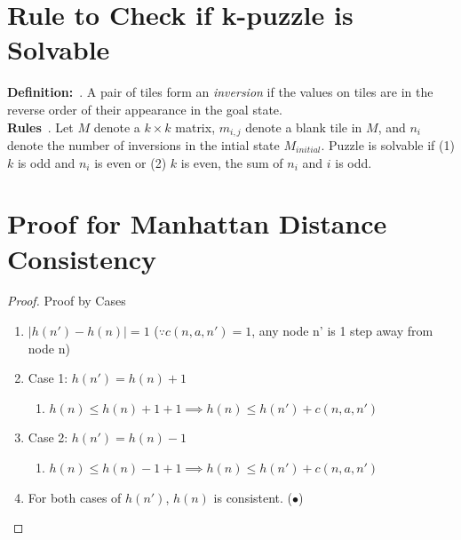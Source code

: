 \documentclass[runningheads]{llncs}
\begin{document}
\section{Rule to Check if k-puzzle is Solvable}
\textbf{Definition:}~\cite{princeton_computer_science_8-puzzle_nodate}. A pair of tiles form an \textit{inversion} if the values on tiles are in the reverse order of their appearance in the goal state. \\
\textbf{Rules}~\cite{princeton_computer_science_8-puzzle_nodate}. Let \( M \) denote a \( k \times k \) matrix, \( m_{i, j} \) denote a blank tile in \( M \), and \( n_i \) denote the number of inversions in the intial state \( M_{initial} \). Puzzle is solvable if (1) \( k \) is odd and \( n_i \) is even or (2) \( k \) is even, the sum of \(n_i \) and \( i \) is odd.


\appendix
\section{Proof for Manhattan Distance Consistency}
\label{appendix:manhat_cons}
\begin{proof} Proof by Cases
    \begin{enumerate}
        \item \( |h(n') - h(n)| = 1 \) (\( \because c(n, a, n') = 1 \), any node n' is 1 step away from node n)
        \item Case 1: \( h(n') = h(n) + 1 \)
        \begin{enumerate}
            \item \( h(n) \leq h(n) + 1 + 1 \implies h(n) \leq h(n') + c(n, a, n') \)
        \end{enumerate}
        \item Case 2: \( h(n') = h(n) - 1 \)
        \begin{enumerate}
            \item \( h(n) \leq h(n) - 1 + 1 \implies h(n) \leq h(n') + c(n, a, n') \)
        \end{enumerate}
        \item For both cases of \( h(n') \), \( h(n) \) is consistent. (\(\bullet\))
    \end{enumerate}
\end{proof}

\end{document}

